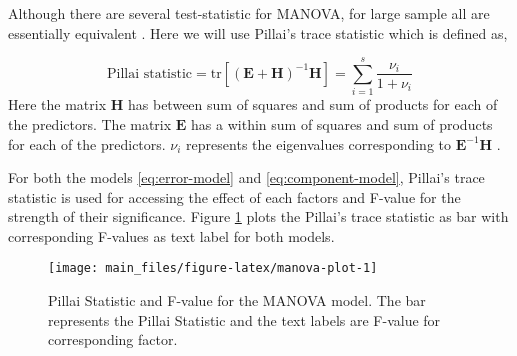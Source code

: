 \documentclass[12pt,3p,authoryear]{elsarticle}
\begin{document}
Although there are several test-statistic for MANOVA, for large sample
all are essentially equivalent \citep{johnson2018applied}. Here we will
use Pillai's trace statistic which is defined as,

\begin{equation}
\text{Pillai statistic} = \text{tr}\left[
\left(\mathbf{E} + \mathbf{H}\right)^{-1}\mathbf{H}
\right] = \sum_{i=1}^s{\frac{\nu_i}{1 + \nu_i}}
\label{eq:pillai}
\end{equation} Here the matrix \(\mathbf{H}\) has between sum of squares
and sum of products for each of the predictors. The matrix
\(\mathbf{E}\) has a within sum of squares and sum of products for each
of the predictors. \(\nu_i\) represents the eigenvalues corresponding to
\(\mathbf{E}^{-1}\mathbf{H}\) \citep{rencher2003methods}.

For both the models \eqref{eq:error-model} and \eqref{eq:component-model},
Pillai's trace statistic is used for accessing the effect of each
factors and F-value for the strength of their significance. Figure
\ref{fig:manova-plot} plots the Pillai's trace statistic as bar with
corresponding F-values as text label for both models.





\begin{figure}
\texttt{[image: main\_files/figure-latex/manova-plot-1]} \caption{Pillai Statistic and F-value for the MANOVA model. The
bar represents the Pillai Statistic and the text labels are F-value for
corresponding factor.}\label{fig:manova-plot}
\end{figure}
\end{document}
